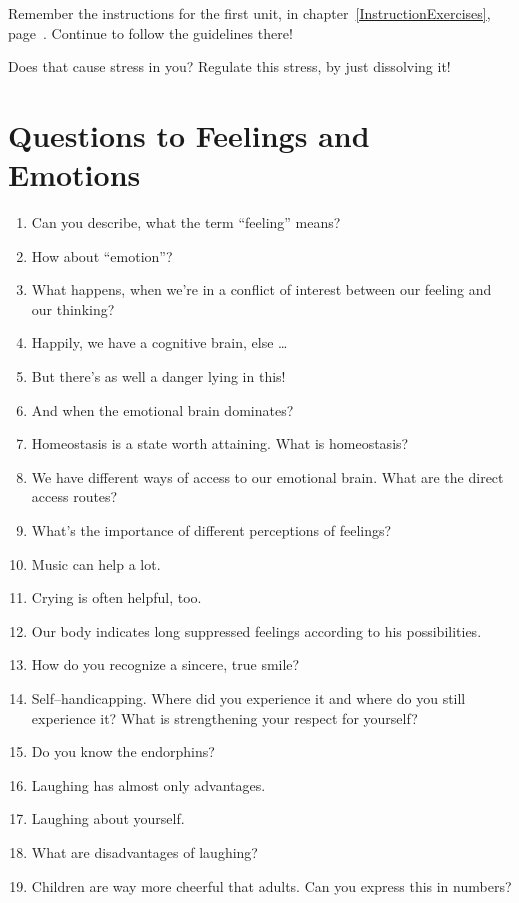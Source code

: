 \documentclass[../main.tex]{subfiles}
\begin{document}
Remember the instructions for the first unit, in chapter~\ref{InstructionExercises}, page~\pageref{InstructionExercises}.
Continue to follow the guidelines there!

Does that cause stress in you?
Regulate this stress, by just dissolving it!

\section[Question]{Questions to Feelings and Emotions}

\begin{enumerate}
\item Can you describe, what the term ``feeling'' means?
\item How about ``emotion''?
\item What happens, when we're in a conflict of interest between our feeling and our thinking?
\item Happily, we have a cognitive brain, else \ldots
\item But there's as well a danger lying in this!
\item And when the emotional brain dominates?
\item Homeostasis is a state worth attaining. What is homeostasis?
\item We have different ways of access to our emotional brain. What are the direct access routes?
\item What's the importance of different perceptions of feelings?
  \vspace{4mm}
\item Music can help a lot.
\item Crying is often helpful, too.
  \vspace{4mm}
\item Our body indicates long suppressed feelings according to his possibilities.
\item How do you recognize a sincere, true smile?
\item Self--handicapping. Where did you experience it and where do you still experience it?
  What is strengthening your respect for yourself?
\item Do you know the endorphins?
\item Laughing has almost only advantages.
\item Laughing about yourself.
\item What are disadvantages of laughing?
\item Children are way more cheerful that adults. Can you express this in numbers?

\end{enumerate}
\end{document}
